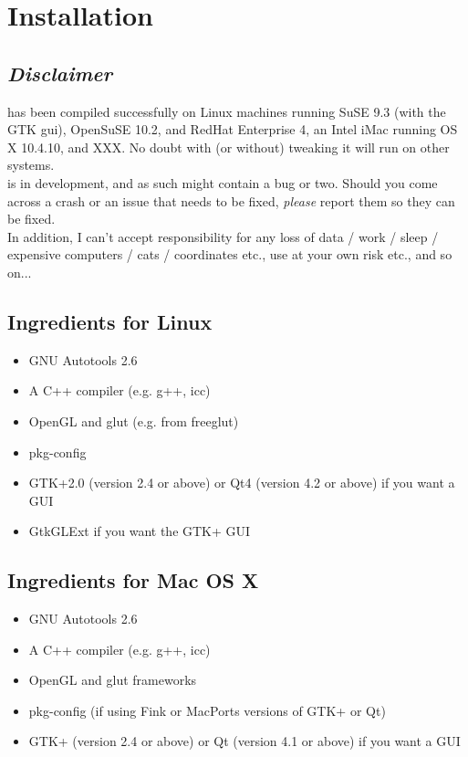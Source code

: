 \chapter{Installation}
\label{sec:install}

\section{\emph{Disclaimer}}
\label{sec:disclaimer}

\progname{} has been compiled successfully on Linux machines running SuSE 9.3 (with the GTK gui), OpenSuSE 10.2, and RedHat Enterprise 4, an Intel iMac running OS X 10.4.10, and XXX. No doubt with (or without) tweaking it will run on other systems.\\

\progname{} is in development, and as such might contain a bug or two. Should you come across a crash or an issue that needs to be fixed, \emph{please} report them so they can be fixed.\\

In addition, I can't accept responsibility for any loss of data / work / sleep / expensive computers / cats / coordinates etc., use at your own risk etc., and so on...\\

\section{Ingredients for Linux}
\label{sec:linuxinstall}
\begin{itemize}
	\item GNU Autotools 2.6
	\item A C++ compiler (e.g. g++, icc)
	\item OpenGL and glut (e.g. from freeglut)
	\item pkg-config
	\item GTK+2.0 (version 2.4 or above) or Qt4 (version 4.2 or above) if you want a GUI
	\item GtkGLExt if you want the GTK+ GUI
\end{itemize}

\section{Ingredients for Mac OS X}
\label{sec:macinstall}
\begin{itemize}
	\item GNU Autotools 2.6
	\item A C++ compiler (e.g. g++, icc)
	\item OpenGL and glut frameworks
	\item pkg-config (if using Fink or MacPorts versions of GTK+ or Qt)
	\item GTK+ (version 2.4 or above) or Qt (version 4.1 or above) if you want a GUI
\end{itemize}

